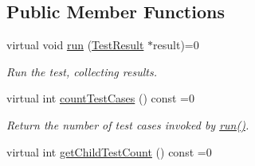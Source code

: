 \subsection*{Public Member Functions}
\begin{DoxyCompactItemize}
\item 
virtual void \hyperlink{class_test_a7beeb95dc0d058bd3bfea1a75463cb03}{run} (\hyperlink{class_test_result}{Test\+Result} $\ast$result)=0\hypertarget{class_test_a7beeb95dc0d058bd3bfea1a75463cb03}{}\label{class_test_a7beeb95dc0d058bd3bfea1a75463cb03}

\begin{DoxyCompactList}\small\item\em Run the test, collecting results. \end{DoxyCompactList}\item 
virtual int \hyperlink{class_test_a246dbb9bc986693c051b4f668e7706a6}{count\+Test\+Cases} () const  =0
\begin{DoxyCompactList}\small\item\em Return the number of test cases invoked by \hyperlink{class_test_a7beeb95dc0d058bd3bfea1a75463cb03}{run()}. \end{DoxyCompactList}\item 
virtual int \hyperlink{class_test_a9db1d761ce318f988d764272a4032119}{get\+Child\+Test\+Count} () const  =0\hypertarget{class_test_a9db1d761ce318f988d764272a4032119}{}\label{class_test_a9db1d761ce318f988d764272a4032119}


\end{DoxyCompactItemize}
